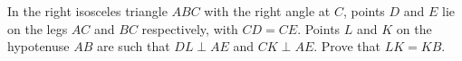 In the right isosceles triangle $ABC$ with the right angle at $C$, points $D$ and $E$ lie on the legs $AC$ and $BC$ respectively, with $CD=CE$. Points $L$ and $K$ on the hypotenuse $AB$ are such that $DL\perp AE$ and $CK\perp AE$. Prove that $LK=KB$.
